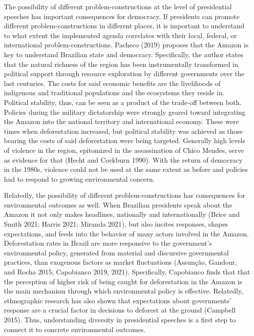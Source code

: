 \documentclass[
]{article}
\begin{document}
The possibility of different problem-constructions at the level of
presidential speeches has important consequences for democracy. If
presidents can promote different problem-constructions in different
places, it is important to understand to what extent the implemented
agenda correlates with their local, federal, or international
problem-constructions. Pacheco (2019) proposes that the Amazon is key to
understand Brazilian state and democracy. Specifically, the author
states that the natural richness of the region has been instrumentally
transformed in political support through resource exploration by
different governments over the last centuries. The costs for said
economic benefits are the livelihoods of indigenous and traditional
populations and the ecosystems they reside in. Political stability,
thus, can be seen as a product of the trade-off between both. Policies
during the military dictatorship were strongly geared toward integrating
the Amazon into the national territory and international economy. These
were times when deforestation increased, but political stability was
achieved as those bearing the costs of said deforestation were being
targeted. Generally high levels of violence in the region, epitomized in
the assassination of Chico Mendes, serve as evidence for that (Hecht and
Cockburn 1990). With the return of democracy in the 1980s, violence
could not be used at the same extent as before and policies had to
respond to growing environmental concern.

Relatedly, the possibility of different problem-constructions has
consequences for environmental outcomes as well. When Brazilian
presidents speak about the Amazon it not only makes headlines,
nationally and internationally (Brice and Smith 2021; Harris 2021;
Miranda 2021), but also incites responses, shapes expectations, and
feeds into the behavior of many actors involved in the Amazon.
Deforestation rates in Brazil are more responsive to the government's
environmental policy, generated from material and discursive
governmental practices, than exogenous factors as market fluctuations
(Assunção, Gandour, and Rocha 2015; Capobianco 2019, 2021).
Specifically, Capobianco finds that that the perception of higher risk
of being caught for deforestation in the Amazon is the main mechanism
through which environmental policy is effective. Relatedly, ethnographic
research has also shown that expectations about governments' response
are a crucial factor in decisions to deforest at the ground (Campbell
2015). Thus, understanding diversity in presidential speeches is a first
step to connect it to concrete environmental outcomes.
\end{document}
